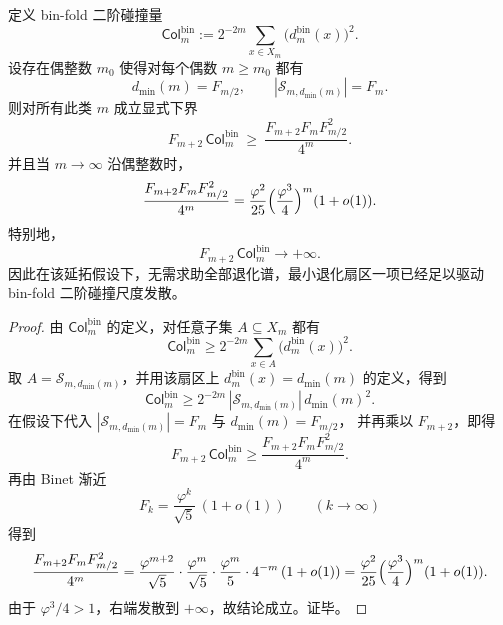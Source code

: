 \begin{theorem}\label{thm:gut-bin-min-sector-forces-collision-divergence}
定义 bin-fold 二阶碰撞量
\[
\mathsf{Col}^{\mathrm{bin}}_m
:=2^{-2m}\sum_{x\in X_m}\bigl(d^{\mathrm{bin}}_m(x)\bigr)^2.
\]
设存在偶整数 \(m_0\) 使得对每个偶数 \(m\ge m_0\) 都有
\[
d_{\min}(m)=F_{m/2},
\qquad
|\mathcal S_{m,d_{\min}(m)}|=F_m.
\]
则对所有此类 \(m\) 成立显式下界
\[
F_{m+2}\,\mathsf{Col}^{\mathrm{bin}}_m
\ \ge\
\frac{F_{m+2}F_mF_{m/2}^2}{4^m}.
\]
并且当 \(m\to\infty\) 沿偶整数时，
\[
\frac{F_{m+2}F_mF_{m/2}^2}{4^m}
=
\frac{\varphi^2}{25}\Bigl(\frac{\varphi^3}{4}\Bigr)^m(1+o(1)).
\]
特别地，
\[
F_{m+2}\,\mathsf{Col}^{\mathrm{bin}}_m\longrightarrow +\infty.
\]
因此在该延拓假设下，无需求助全部退化谱，最小退化扇区一项已经足以驱动 bin-fold 二阶碰撞尺度发散。
\end{theorem}
\begin{proof}
由 \(\mathsf{Col}^{\mathrm{bin}}_m\) 的定义，对任意子集 \(A\subseteq X_m\) 都有
\[
\mathsf{Col}^{\mathrm{bin}}_m
\ge
2^{-2m}\sum_{x\in A}\bigl(d^{\mathrm{bin}}_m(x)\bigr)^2.
\]
取 \(A=\mathcal S_{m,d_{\min}(m)}\)，并用该扇区上
\(
d^{\mathrm{bin}}_m(x)=d_{\min}(m)
\)
的定义，得到
\[
\mathsf{Col}^{\mathrm{bin}}_m
\ge
2^{-2m}\,|\mathcal S_{m,d_{\min}(m)}|\,d_{\min}(m)^2.
\]
在假设下代入
\(
|\mathcal S_{m,d_{\min}(m)}|=F_m
\)
与
\(
d_{\min}(m)=F_{m/2}
\)，
并再乘以 \(F_{m+2}\)，即得
\[
F_{m+2}\,\mathsf{Col}^{\mathrm{bin}}_m
\ge
\frac{F_{m+2}F_mF_{m/2}^2}{4^m}.
\]
再由 Binet 渐近
\[
F_k=\frac{\varphi^k}{\sqrt5}\,(1+o(1))
\qquad(k\to\infty)
\]
得到
\[
\frac{F_{m+2}F_mF_{m/2}^2}{4^m}
=
\frac{\varphi^{m+2}}{\sqrt5}\cdot
\frac{\varphi^m}{\sqrt5}\cdot
\frac{\varphi^m}{5}\cdot
4^{-m}\,(1+o(1))
=
\frac{\varphi^2}{25}\Bigl(\frac{\varphi^3}{4}\Bigr)^m(1+o(1)).
\]
由于 \(\varphi^3/4>1\)，右端发散到 \(+\infty\)，故结论成立。证毕。
\end{proof}

